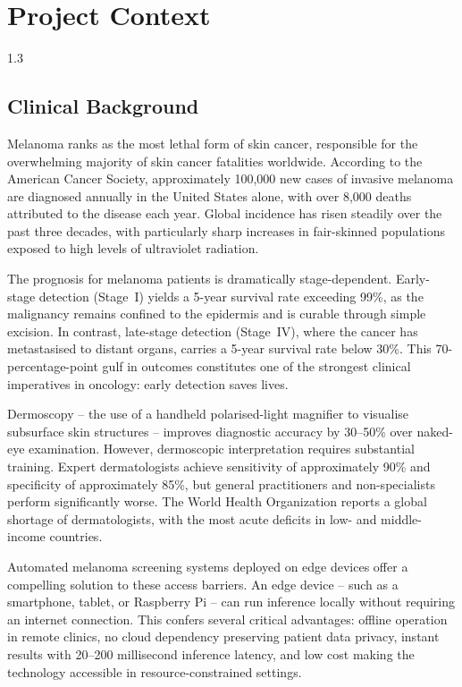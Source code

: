 
\chapter{Project Context}
\begin{spacing}{1.3}

\section{Clinical Background}

Melanoma ranks as the most lethal form of skin cancer, responsible for the overwhelming majority of skin cancer fatalities worldwide. According to the American Cancer Society, approximately 100,000 new cases of invasive melanoma are diagnosed annually in the United States alone, with over 8,000 deaths attributed to the disease each year. Global incidence has risen steadily over the past three decades, with particularly sharp increases in fair-skinned populations exposed to high levels of ultraviolet radiation.

The prognosis for melanoma patients is dramatically stage-dependent. Early-stage detection (Stage~I) yields a 5-year survival rate exceeding 99\%, as the malignancy remains confined to the epidermis and is curable through simple excision. In contrast, late-stage detection (Stage~IV), where the cancer has metastasised to distant organs, carries a 5-year survival rate below 30\%. This 70-percentage-point gulf in outcomes constitutes one of the strongest clinical imperatives in oncology: early detection saves lives.

Dermoscopy -- the use of a handheld polarised-light magnifier to visualise subsurface skin structures -- improves diagnostic accuracy by 30--50\% over naked-eye examination. However, dermoscopic interpretation requires substantial training. Expert dermatologists achieve sensitivity of approximately 90\% and specificity of approximately 85\%, but general practitioners and non-specialists perform significantly worse. The World Health Organization reports a global shortage of dermatologists, with the most acute deficits in low- and middle-income countries.

Automated melanoma screening systems deployed on edge devices offer a compelling solution to these access barriers. An edge device -- such as a smartphone, tablet, or Raspberry Pi -- can run inference locally without requiring an internet connection. This confers several critical advantages: offline operation in remote clinics, no cloud dependency preserving patient data privacy, instant results with 20--200 millisecond inference latency, and low cost making the technology accessible in resource-constrained settings.


\end{spacing}
